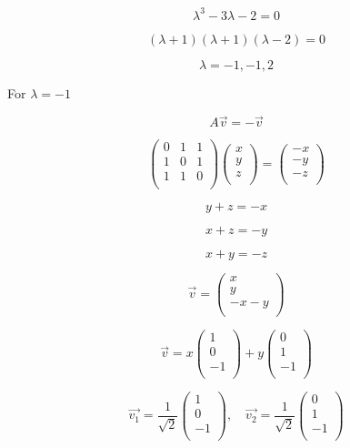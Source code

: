 \documentclass[12pt]{article}
\begin{document}
\[
    \lambda^3 - 3 \lambda - 2 = 0
\]

\[
    (\lambda + 1)(\lambda + 1)(\lambda - 2) = 0
\]

\[
    \lambda = -1, -1, 2
\]

For \(\lambda = -1\)

\[
    A\vec{v} = -\vec{v}
\]

\[
    \begin{pmatrix}
        0 & 1 & 1 \\
        1 & 0 & 1 \\
        1 & 1 & 0 \\
    \end{pmatrix} \begin{pmatrix}
        x \\
        y \\
        z \\
    \end{pmatrix} = \begin{pmatrix}
        -x \\
        -y \\
        -z \\
    \end{pmatrix}
\]

\[
    y + z = -x
\]

\[
    x + z = -y
\]

\[
    x + y = -z
\]

\[
    \vec{v} = \begin{pmatrix}
        x    \\
        y    \\
        -x-y \\
    \end{pmatrix}
\]

\[
    \vec{v} = x \begin{pmatrix}
        1  \\
        0  \\
        -1 \\
    \end{pmatrix} + y \begin{pmatrix}
        0  \\
        1  \\
        -1 \\
    \end{pmatrix}
\]

\[
    \vec{v_1} = \frac{1}{\sqrt{2}} \begin{pmatrix}
        1  \\
        0  \\
        -1 \\
    \end{pmatrix},\quad \vec{v_2} = \frac{1}{\sqrt{2}} \begin{pmatrix}
        0  \\
        1  \\
        -1 \\
    \end{pmatrix}
\]
\end{document}
